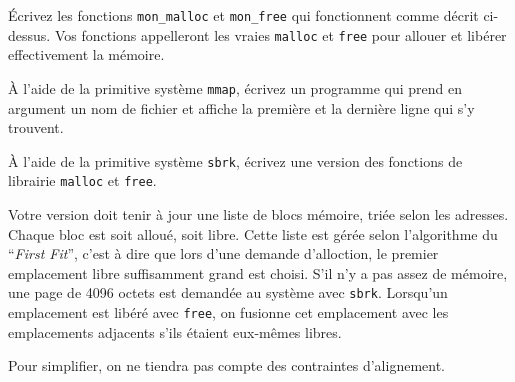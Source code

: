 Écrivez les fonctions \texttt {mon\_malloc} et \texttt {mon\_free}
qui fonctionnent comme décrit ci-dessus. Vos fonctions appelleront
les vraies \texttt {malloc} et \texttt {free} pour allouer et libérer
effectivement la mémoire.


\question

À l'aide de la primitive système \texttt {mmap}, écrivez un programme
qui prend en argument un nom de fichier et affiche la première et la
dernière ligne qui s'y trouvent.


\question

\`A l'aide de la primitive système {\tt sbrk}, écrivez une version
des fonctions de librairie {\tt malloc} et {\tt free}.

Votre version doit tenir à jour une liste de blocs mémoire, triée
selon les adresses. Chaque bloc
est soit alloué, soit libre. Cette liste est gérée selon l'algorithme
du ``{\em First Fit\/}'', c'est à dire que lors d'une demande
d'alloction, le premier emplacement libre suffisamment grand est
choisi. S'il n'y a pas assez de mémoire, une page de 4096 octets
est demandée au système avec {\tt sbrk}. Lorsqu'un emplacement est
libéré avec {\tt free}, on fusionne cet emplacement avec les
emplacements adjacents s'ils étaient eux-mêmes libres.

Pour simplifier, on ne tiendra pas compte des contraintes
d'alignement.
